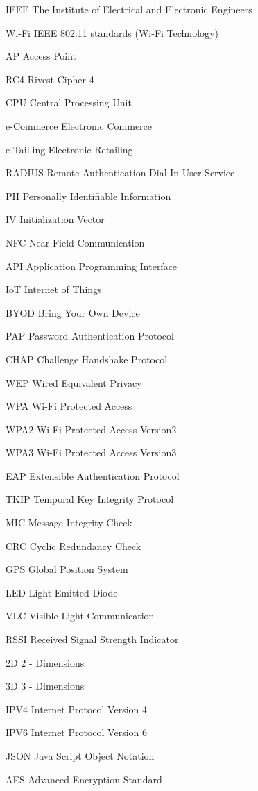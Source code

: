 \documentclass{report}
\begin{document}
	\begin{abbrv}
		
		\item[IEEE]				The Institute of Electrical and Electronic Engineers
		\item[Wi-Fi]			IEEE 802.11 standards (Wi-Fi Technology)
		\item[AP]				Access Point
		\item[RC4]				Rivest Cipher 4
		\item[CPU]				Central Processing Unit
		\item[e-Commerce]		Electronic Commerce
		\item[e-Tailling]		Electronic Retailing
		\item[RADIUS]			Remote Authentication Dial-In User Service
		\item[PII]				Personally Identifiable Information
		\item[IV]				Initialization Vector
		\item[NFC]				Near Field Communication	
		\item[API]				Application Programming Interface
		\item[IoT]				Internet of Things
		\item[BYOD]				Bring Your Own Device
		\item[PAP]				Password Authentication Protocol
		\item[CHAP]				Challenge Handshake Protocol
		\item[WEP]				Wired Equivalent Privacy
		\item[WPA]				Wi-Fi Protected Access
		\item[WPA2]				Wi-Fi Protected Access Version2	
		\item[WPA3]				Wi-Fi Protected Access Version3
		\item[EAP]				Extensible Authentication Protocol
		\item[TKIP]				Temporal Key Integrity Protocol
		\item[MIC]				Message Integrity Check
		\item[CRC]				Cyclic Redundancy Check
		\item[GPS]				Global Position System
		\item[LED]				Light Emitted Diode
		\item[VLC]				Visible Light Communication
		\item[RSSI]				Received Signal Strength Indicator
		\item[2D]				2 - Dimensions
		\item[3D]				3 - Dimensions
		\item[IPV4]				Internet Protocol Version 4
		\item[IPV6]				Internet Protocol Version 6
		\item[JSON]				Java Script Object Notation
		\item[AES]				Advanced Encryption Standard
	\end{abbrv}
	
\end{document}
